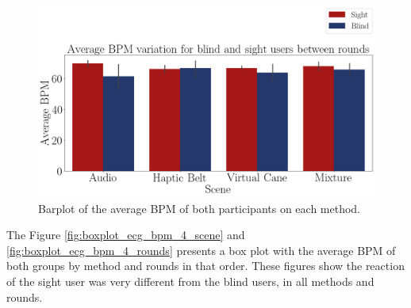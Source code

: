 \begin{figure}[!htb]
    \centering
    \includegraphics[width = 0.8\linewidth]{Resultados/ECG/Figuras/png/barplot_ecg_bpm_4_scene.png}
    \caption{Barplot of the average BPM of both participants on each method.}
    \label{fig:barplot_ecg_bpm_4_scene}
\end{figure}

The Figure \ref{fig:boxplot_ecg_bpm_4_scene} and \ref{fig:boxplot_ecg_bpm_4_rounds} presents a box plot with the average BPM of both groups by method and rounds in that order. These figures show the reaction of the sight user was very different from the blind users, in all methods and rounds.

